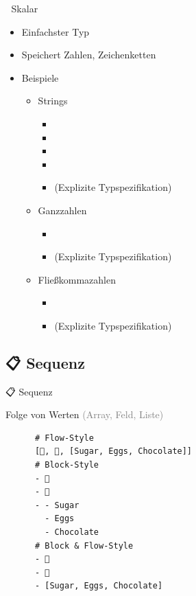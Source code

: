 \documentclass{beamer}
\begin{document}
\begin{frame}[fragile]{📏 Skalar}
  \begin{itemize}
    \item Einfachster Typ
    \item Speichert Zahlen, Zeichenketten
    \item Beispiele
    \begin{itemize}
      \item Strings
      \begin{itemize}
        \item {}
        \item {}
        \item {}
        \item {}
        \item {} (Explizite Typspezifikation)
      \end{itemize}
      \item Ganzzahlen
      \begin{itemize}
        \item {}
        \item {} (Explizite Typspezifikation)
      \end{itemize}
      \item Fließkommazahlen
      \begin{itemize}
        \item {}
        \item {} (Explizite Typspezifikation)
      \end{itemize}
    \end{itemize}
  \end{itemize}
\end{frame}

\subsection{📋 Sequenz}

\begin{frame}[fragile]{📋 Sequenz}
  \begin{block}{Folge von Werten \textcolor{gray}{(Array, Feld, Liste)}}~\\
    \begin{verbatim}
      # Flow-Style
      [🍎, 🍊, [Sugar, Eggs, Chocolate]]
      # Block-Style
      - 🍎
      - 🍊
      - - Sugar
        - Eggs
        - Chocolate
      # Block & Flow-Style
      - 🍎
      - 🍊
      - [Sugar, Eggs, Chocolate]
    \end{verbatim}
  \end{block}
\end{frame}
\end{document}
